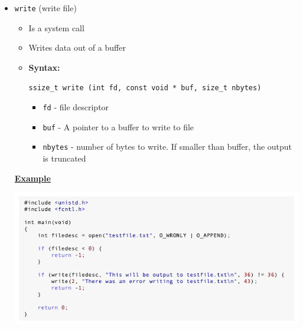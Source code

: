 \documentclass[12pt]{article}
\begin{document}
\begin{enumerate}[1.]
\begin{enumerate}[a)]
\begin{itemize}
\begin{itemize}
\begin{itemize}
                \end{itemize}

                \item \texttt{write} (write file)

                \begin{itemize}
                    \item Is a system call
                    \item Writes data out of a buffer
                    \item \textbf{Syntax:}

                    \bigskip

                    \texttt{ssize\_t write (int fd, const void * buf, size\_t nbytes)}

                    \bigskip

                    \begin{itemize}
                        \item \texttt{fd} - file descriptor
                        \item \texttt{buf} - A pointer to a buffer to write to file
                        \item \texttt{nbytes} - number of bytes to write. If smaller than buffer, the output is truncated
                    \end{itemize}
                \end{itemize}

                \bigskip

                \underline{\textbf{Example}}

                \bigskip

                \begin{center}
                \includegraphics[width=\linewidth]{../images/midterm_4_solution_4.png}
                \end{center}


\end{itemize}
\end{itemize}
\end{enumerate}
\end{enumerate}
\end{document}
